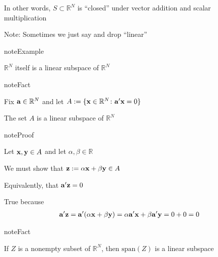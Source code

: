 \documentclass[letterpaper,10pt,english]{jupyterBook}
\begin{document}
\sphinxAtStartPar
In other words, \(S \subset \mathbb{R}^N\) is “closed” under vector addition
and scalar multiplication

\sphinxAtStartPar
Note: Sometimes we just say  and drop “linear”

\begin{sphinxadmonition}{note}{Example}

\sphinxAtStartPar
\(\mathbb{R}^N\) itself is a linear subspace of \(\mathbb{R}^N\)
\end{sphinxadmonition}

\begin{sphinxadmonition}{note}{Fact}

\sphinxAtStartPar
Fix \({\bf a} \in \mathbb{R}^N\) and let \(A := \{ {\bf x} \in \mathbb{R}^N \colon {\bf a }'{\bf x} = 0 \}\)

\sphinxAtStartPar
The set \(A\) is a linear subspace of \(\mathbb{R}^N\)
\end{sphinxadmonition}

\begin{sphinxadmonition}{note}{Proof}

\sphinxAtStartPar
Let \({\bf x}, {\bf y} \in A\) and let \(\alpha, \beta \in \mathbb{R}\)

\sphinxAtStartPar
We must show that \({\bf z} := \alpha {\bf x} + \beta {\bf y} \in A\)

\sphinxAtStartPar
Equivalently, that \({\bf a}' {\bf z} = 0\)

\sphinxAtStartPar
True because
\begin{equation*}
\begin{split}
%
{\bf a}' {\bf z} =
{\bf a}' (\alpha {\bf x} + \beta {\bf y}) = \alpha
{\bf a}' {\bf x} + \beta {\bf a}' {\bf y} = 0 + 0 = 0
%
\end{split}
\end{equation*}\end{sphinxadmonition}

\begin{sphinxadmonition}{note}{Fact}

\sphinxAtStartPar
If \(Z\) is a nonempty subset of \(\mathbb{R}^N\), then \(\mathrm{span}(Z)\) is a linear subspace
\end{sphinxadmonition}
\end{document}
